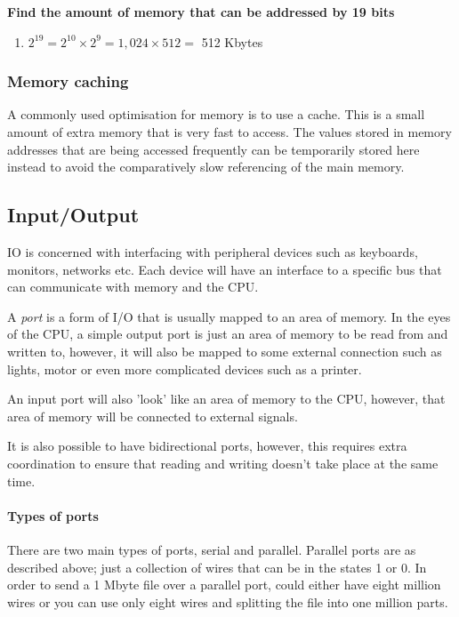 {\bf Find the amount of memory that can be addressed by 19 bits}

\begin{enumerate}
	\item $2^{19} = 2^{10} \times 2^{9} = 1,024 \times 512 = $ 512 Kbytes
\end{enumerate}

\subsubsection{Memory caching}

A commonly used optimisation for memory is to use a cache. This is a small
amount of extra memory that is very fast to access. The values stored in memory
addresses that are being accessed frequently can be temporarily stored here
instead to avoid the comparatively slow referencing of the main memory.

\subsection{Input/Output}

IO is concerned with interfacing with peripheral devices such as keyboards,
monitors, networks etc. Each device will have an interface to a specific bus
that can communicate with memory and the CPU.

A {\it port} is a form of I/O  that is usually mapped to an area of memory. In
the eyes of the CPU, a simple output port is just an area of memory to be read
from and written to, however, it will also be mapped to some external connection
such as lights, motor or even more complicated devices such as a printer.

An input port will also 'look' like an area of memory to the CPU, however, that
area of memory will be connected to external signals.


It is also possible to have bidirectional ports, however, this requires extra
coordination to ensure that reading and writing doesn't take place at the same
time.

\paragraph{Types of ports}\mbox{}

There are two main types of ports, serial and parallel. Parallel ports are as
described above; just a collection of wires that can be in the states 1 or 0. In
order to send a 1 Mbyte file over a parallel port, could either have eight
million wires or you can use only eight wires and splitting the file into one
million parts.

